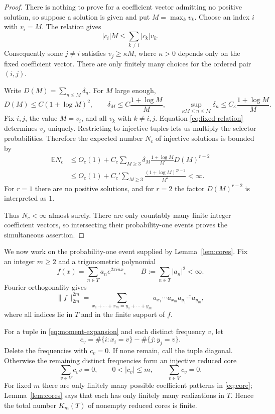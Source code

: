 \documentclass[11pt]{article}
\newcommand{\E}{\mathbb E}
\newcommand{\1}{\mathbf 1}
\begin{document}
\begin{proof}
There is nothing to prove for a coefficient vector admitting no positive
solution, so suppose a solution is given and put $M=\max_k v_k$. Choose an
index $i$ with $v_i=M$. The relation gives
\[
 |c_i|M\leq\sum_{k\ne i}|c_k|v_k.
\]
Consequently some $j\ne i$ satisfies $v_j\geq\kappa M$, where
$\kappa>0$ depends only on the fixed coefficient vector. There are only
finitely many choices for the ordered pair $(i,j)$.

Write $D(M)=\sum_{n\leq M}\delta_n$. For $M$ large enough,
\begin{equation}\label{eq:selector-bounds}
 D(M)\leq C(1+\log M)^2,
 \qquad
 \delta_M\leq C\frac{1+\log M}{M},
 \qquad
 \sup_{\kappa M\leq n\leq M}\delta_n
 \leq C_{\kappa}\frac{1+\log M}{M}.
\end{equation}
Fix $i,j$, the value $M=v_i$, and all $v_k$ with $k\ne i,j$.
Equation \eqref{eq:fixed-relation} determines $v_j$ uniquely. Restricting to
injective tuples lets us multiply the selector probabilities. Therefore the
expected number $N_c$ of injective solutions is bounded by
\begin{align*}
 \E N_c
 &\leq O_c(1)+
 C_c\sum_{M\geq3}
 \delta_M\frac{1+\log M}{M}D(M)^{r-2} \\
 &\leq O_c(1)+C_c'
 \sum_{M\geq3}\frac{(1+\log M)^{2r-2}}{M^2}<\infty.
\end{align*}
For $r=1$ there are no positive solutions, and for $r=2$ the factor
$D(M)^{r-2}$ is interpreted as $1$.

Thus $N_c<\infty$ almost surely. There are only countably many finite integer
coefficient vectors, so intersecting their probability-one events proves the
simultaneous assertion.
\end{proof}

We now work on the probability-one event supplied by Lemma~\ref{lem:cores}.
Fix an integer $m\geq2$ and a trigonometric polynomial
\[
 f(x)=\sum_{n\in T}a_ne^{2\pi i n x},
 \qquad B:=\sum_{n\in T}|a_n|^2<\infty.
\]
Fourier orthogonality gives
\begin{equation}\label{eq:moment-expansion}
 \|f\|_{2m}^{2m}
 =\sum_{x_1+\cdots+x_m=y_1+\cdots+y_m}
 a_{x_1}\cdots a_{x_m}
 \overline{a_{y_1}\cdots a_{y_m}},
\end{equation}
where all indices lie in $T$ and in the finite support of $f$.

For a tuple in \eqref{eq:moment-expansion} and each distinct frequency $v$,
let
\[
 c_v=\#\{i:x_i=v\}-\#\{j:y_j=v\}.
\]
Delete the frequencies with $c_v=0$. If none remain, call the tuple diagonal.
Otherwise the remaining distinct frequencies form an injective reduced core
\begin{equation}\label{eq:core}
 \sum_{v\in V}c_vv=0,
 \qquad 0<|c_v|\leq m,
 \qquad \sum_{v\in V}c_v=0.
\end{equation}
For fixed $m$ there are only finitely many possible coefficient patterns in
\eqref{eq:core}; Lemma~\ref{lem:cores} says that each has only finitely many
realizations in $T$. Hence the total number $K_m(T)$ of nonempty reduced cores
is finite.
\end{document}
